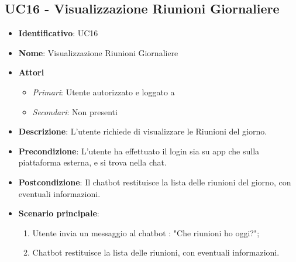 \subsection{UC16 - Visualizzazione Riunioni Giornaliere }
\begin{itemize}
	\item \textbf{Identificativo}: UC16
	\item \textbf{Nome}: Visualizzazione Riunioni Giornaliere
	\item \textbf{Attori}
	\begin{itemize} 
		\item \textit{Primari}: Utente autorizzato e loggato a 
		\item \textit{Secondari}: Non presenti
	\end{itemize}
	\item \textbf{Descrizione}: L'utente richiede di visualizzare le Riunioni del giorno.
	\item \textbf{Precondizione}: L'utente ha effettuato il login sia su app che sulla piattaforma esterna, e si trova nella chat.
	\item \textbf{Postcondizione}: Il chatbot restituisce la lista delle riunioni del giorno, con eventuali informazioni.
	\item \textbf{Scenario principale}:  \begin{enumerate}
		\item Utente invia un messaggio al chatbot : "Che riunioni ho oggi?";
		\item Chatbot restituisce la lista delle riunioni, con eventuali informazioni.
	\end{enumerate}
\end{itemize}